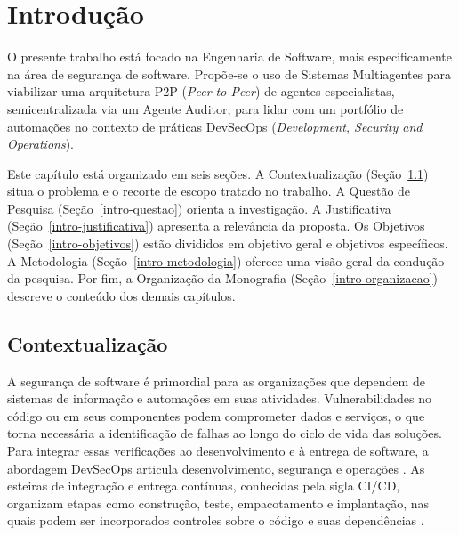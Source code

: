 
\chapter{Introdução}
\label{cap-introducao}

O presente trabalho está focado na Engenharia de Software, mais especificamente na área de segurança de software. Propõe-se o uso de Sistemas Multiagentes para viabilizar uma arquitetura P2P (\textit{Peer-to-Peer}) de agentes especialistas, semicentralizada via um Agente Auditor, para lidar com um portfólio de automações no contexto de práticas DevSecOps (\textit{Development, Security and Operations}).

Este capítulo está organizado em seis seções. A Contextualização (Seção~\ref{intro-contextualizacao}) situa o problema e o recorte de escopo tratado no trabalho. A Questão de Pesquisa (Seção~\ref{intro-questao}) orienta a investigação. A Justificativa (Seção~\ref{intro-justificativa}) apresenta a relevância da proposta. Os Objetivos (Seção~\ref{intro-objetivos}) estão divididos em objetivo geral e objetivos específicos. A Metodologia (Seção~\ref{intro-metodologia}) oferece uma visão geral da condução da pesquisa. Por fim, a Organização da Monografia (Seção~\ref{intro-organizacao}) descreve o conteúdo dos demais capítulos.

\section{Contextualização}
\label{intro-contextualizacao}

A segurança de software é primordial para as organizações que dependem de sistemas de informação e automações em suas atividades. Vulnerabilidades no código ou em seus componentes podem comprometer dados e serviços, o que torna necessária a identificação de falhas ao longo do ciclo de vida das soluções. Para integrar essas verificações ao desenvolvimento e à entrega de software, a abordagem DevSecOps articula desenvolvimento, segurança e operações \cite{owaspDevSecOps}. As esteiras de integração e entrega contínuas, conhecidas pela sigla CI/CD, organizam etapas como construção, teste, empacotamento e implantação, nas quais podem ser incorporados controles sobre o código e suas dependências \cite{chandramouli2024}.

